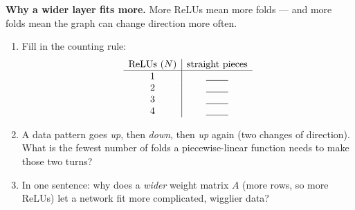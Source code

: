 \documentclass[10pt]{article}
\begin{document}
\begin{tcolorbox}[colback=white, colframe=black!40, title=\textbf{Tier E --- Extension},
    fonttitle=\bfseries, arc=1.5mm, left=3mm, right=3mm, top=2mm, bottom=2mm, breakable]
\textbf{Why a wider layer fits more.} More ReLUs mean more folds --- and more folds mean the graph can
change direction more often.
\begin{enumerate}[leftmargin=1.7em, itemsep=9pt]
  \item Fill in the counting rule:
        \[ \begin{array}{c|c} \text{ReLUs } (N) & \text{straight pieces} \\ \hline
           1 & \blank{0.8cm} \\ 2 & \blank{0.8cm} \\ 3 & \blank{0.8cm} \\ 4 & \blank{0.8cm} \end{array} \]
  \item A data pattern goes \emph{up}, then \emph{down}, then \emph{up} again (two changes of direction).
        What is the fewest number of folds a piecewise-linear function needs to make those two turns? \writeline
  \item In one sentence: why does a \emph{wider} weight matrix $A$ (more rows, so more ReLUs) let a network
        fit more complicated, wigglier data? \writeline
\end{enumerate}
\end{tcolorbox}
\end{document}

